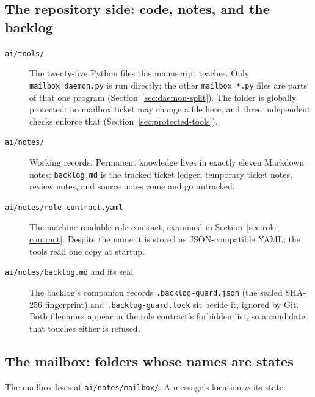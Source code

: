 \documentclass[10pt,aps,prd,twocolumn,nofootinbib]{revtex4-2}
\newcommand{\file}[1]{\texttt{#1}}
\begin{document}
\subsection{The repository side: code, notes, and the backlog}

\begin{description}
  \item[\file{ai/tools/}]  The twenty-five Python files this manuscript
  teaches.  Only \file{mailbox\_daemon.py} is run directly; the other
  \file{mailbox\_*.py} files are parts of that one program
  (Section~\ref{sec:daemon-split}).  The folder is globally protected:
  no mailbox ticket may change a file here, and three independent
  checks enforce that (Section~\ref{sec:protected-tools}).

  \item[\file{ai/notes/}]  Working records.  Permanent knowledge lives
  in exactly eleven Markdown notes; \file{backlog.md} is the tracked
  ticket ledger; temporary ticket notes, review notes, and source notes
  come and go untracked.

  \item[\file{ai/notes/role-contract.yaml}]  The machine-readable role
  contract, examined in Section~\ref{sec:role-contract}.  Despite the
  name it is stored as JSON-compatible YAML; the tools read one copy at
  startup.

  \item[\file{ai/notes/backlog.md} and its seal]  The backlog's
  companion records \file{.backlog-guard.json} (the sealed SHA-256
  fingerprint) and \file{.backlog-guard.lock} sit beside it, ignored by
  Git.  Both filenames appear in the role contract's forbidden list, so
  a candidate that touches either is refused.
\end{description}

\subsection{The mailbox: folders whose names are states}

The mailbox lives at \file{ai/notes/mailbox/}.  A message's location
\emph{is} its state:
\end{document}
